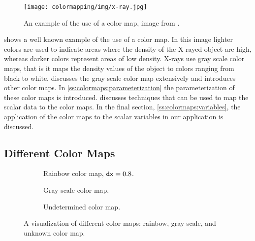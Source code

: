 
\begin{figure}
	\centering
	\texttt{[image: colormapping/img/x-ray.jpg]}
	\caption{An example of the use of a color map, image from \cite{xray}.}
	\label{fig:colormapping:xray}
\end{figure}

 shows a well known example of the use of a color map. In this image lighter colors are used to indicate areas where the density of the X-rayed object are high, whereas darker colors represent areas of low density. X-rays use gray scale color maps, that is it maps the density values of the object to colors ranging from black to white.  discusses the gray scale color map extensively and introduces other color maps. In \cref{ss:colormaps:parameterization} the parameterization of these color maps is introduced.  discusses techniques that can be used to map the scalar data to the color maps. In the final section, \cref{ss:colormaps:variables}, the application of the color maps to the scalar variables in our application is discussed. 

\subsection{Different Color Maps}
\label{ss:colormaps:differentmaps}

\begin{figure}
	\centering
	\begin{subfigure}{\textwidth}
		\centering
		\caption{Rainbow color map, $\mathtt{dx} = 0.8$.}
		\label{fig:colormapping:intro:differntColorMaps:rainbow}
	\end{subfigure}
	\begin{subfigure}{\textwidth}
		\centering
		\caption{Gray scale color map.}
		\label{fig:colormapping:intro:differntColorMaps:grayscale}
	\end{subfigure}	
	\begin{subfigure}{\textwidth}
		\centering
		\caption{Undetermined color map.}
		\label{fig:colormapping:intro:differntColorMaps:ofChoice}
	\end{subfigure}		
	\caption{A visualization of different color maps:  rainbow,  gray scale, and  unknown color map.}
	\label{fig:colormapping:introduction}
\end{figure}

